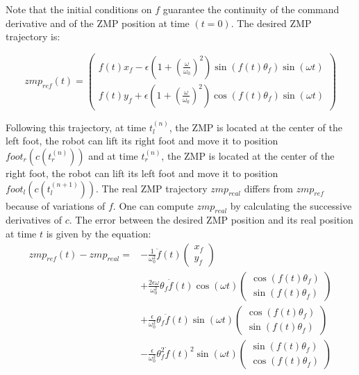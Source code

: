 \documentclass{article}
\begin{document}
Note that the initial conditions on $f$ guarantee the continuity of
the command derivative and of the ZMP position at time $(t=0)$. The
desired ZMP trajectory is:

\[
zmp_{ref}(t) = 
\left(
\begin{array}{c}
f(t) x_f - \epsilon (1+\left( \frac{\omega}{\omega_0} \right)^2)\sin ( f(t) \theta_f) \sin (\omega t)   \\
f(t) y_f + \epsilon (1+\left( \frac{\omega}{\omega_0} \right)^2)\cos ( f(t) \theta_f) \sin (\omega t)
\end{array}
\right)
\]

Following this trajectory, at time $t_l^{(n)}$, the ZMP is located at the center of the left foot,
the robot can lift its right foot and move it to position $foot_r(c(t_r^{(n)}))$ and at time 
$t_r^{(n)}$, the ZMP is located at the center of the right foot, the robot can lift its left foot
and move it to position $foot_l(c(t_l^{(n+1)}))$. The real ZMP trajectory $zmp_{real}$ 
differs from  $zmp_{ref}$ because of variations of $f$. One can compute $zmp_{real}$
by calculating the successive derivatives of $c$. The error between the desired ZMP position
and its real position at time $t$ is given by the equation:
\[
  \begin{array}{cl}
    zmp_{ref}(t) - zmp_{real} = &
    -\frac{1}{\omega_0^2} \ddot{f}(t)
    \left(
    \begin{array}{c}
      x_f \\
      y_f
    \end{array}
    \right) \\
    &
    +
    \frac{2\epsilon \omega}{\omega_0^2} \theta_f \dot{f} (t) \cos(\omega t)
    \left(
    \begin{array}{c}
      \cos( f(t) \theta_f) \\
      \sin( f(t) \theta_f)
    \end{array}
    \right) \\
    &
    +
    \frac{\epsilon}{\omega_0^2} \theta_f \ddot{f} (t) \sin(\omega t)
    \left(
    \begin{array}{c}
      \cos( f(t) \theta_f) \\
      \sin( f(t) \theta_f)
    \end{array}
    \right) \\
    &
    -
    \frac{\epsilon}{\omega_0^2} \theta_f^2 \dot{f} (t)^2 \sin(\omega t)
    \left(
    \begin{array}{c}
      \sin( f(t) \theta_f) \\
      \cos( f(t) \theta_f)
    \end{array}
    \right)
  \end{array}
\]
\end{document}
